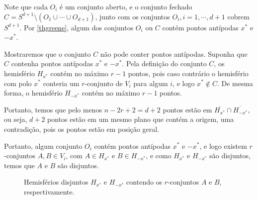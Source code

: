 Note que cada $O_i$ é um conjunto aberto, e o conjunto fechado $C = S^{d+1}\setminus (O_1\cup \cdots \cup O_{d+1})$, junto com os conjuntos $O_i, i=1,\cdots,d+1$ cobrem $S^{d+1}$. Por \ref{thgreene}, algum dos conjuntos $O_i$ ou $C$ contém pontos antípodas $x^*$ e $-x^*$.

Mostraremos que o conjunto $C$ não pode conter pontos antípodas. Suponha que $C$ contenha pontos antípodas $x^*$ e $-x^*$. Pela definição do conjunto $C$, os hemisfério $H_{x^*}$ contém no máximo $r-1$ pontos, pois caso contrário o hemisfério com polo $x^*$ conteria um $r$-conjunto de $V_i$ para algum $i$, e logo $x^* \not\in C$. De mesma forma, o hemisfério $H_{-x^*}$ contém no máximo $r-1$ pontos.

Portanto, temos que pelo menos $n - 2r + 2 = d+2$ pontos estão em $\overline{H_{x^*}}\cap\overline{H_{-x^*}}$, ou seja, $d+2$ pontos estão em um mesmo plano que contém a origem, uma contradição, pois os pontos estão em posição geral.

Portanto, algum conjunto $O_i$ contém pontos antípodas $x^*$ e $-x^*$, e logo existem $r$-conjuntos $A,B \in V_i$, com $A\in H_{x^*}$ e $B\in H_{-x^*}$, e como $H_{x^*}$ e $H_{-x^*}$ são disjuntos, temos que $A$ e $B$ são disjuntos.

\begin{figure}[H]
\centering
{}
\caption{Hemisférios disjuntos $H_{x^*}$ e $H_{-x^*}$ contendo os $r$-conjuntos $A$ e $B$, respectivamente.}
\label{fig:knesersphereAB}
\end{figure}

